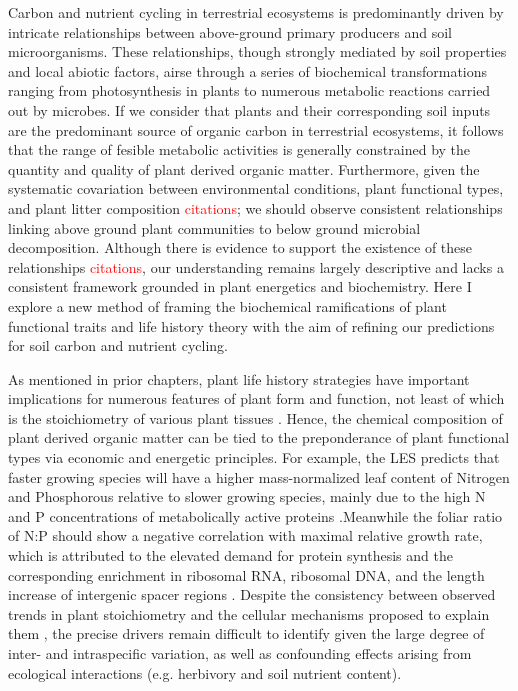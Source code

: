 Carbon and nutrient cycling in terrestrial ecosystems is predominantly driven by intricate relationships between above-ground primary producers and soil microorganisms. These relationships, though strongly mediated by soil properties and local abiotic factors, airse through a series of biochemical transformations ranging from photosynthesis in plants to numerous metabolic reactions carried out by microbes. If we consider that plants and their corresponding soil inputs are the predominant source of organic carbon in terrestrial ecosystems, it follows that the range of fesible metabolic activities is generally constrained by the quantity and quality of plant derived organic matter. Furthermore, given the systematic covariation between environmental conditions, plant functional types, and plant litter composition \textcolor{red}{citations}; we should observe consistent relationships linking above ground plant communities to below ground microbial decomposition. Although there is evidence to support the existence of these relationships \textcolor{red}{citations}, our understanding remains largely descriptive and lacks a consistent framework grounded in plant energetics and biochemistry. Here I explore a new method of framing the biochemical ramifications of plant functional traits and life history theory with the aim of refining our predictions for soil carbon and nutrient cycling. 


As mentioned in prior chapters, plant life history strategies have important implications for numerous features of plant form and function, not least of which is the stoichiometry of various plant tissues \cite{reich2014a,wright2004a}. Hence, the chemical composition of plant derived organic matter can be tied to the preponderance of plant functional types via economic and energetic principles. For example, the LES predicts that faster growing species will have a higher mass-normalized leaf content of Nitrogen and Phosphorous relative to slower growing species, mainly due to the high N and P concentrations of metabolically active proteins \cite{diaz_global_2016}.Meanwhile the foliar ratio of N:P should show a negative correlation with maximal relative growth rate, which is attributed to the elevated demand for protein synthesis and the corresponding enrichment in ribosomal RNA, ribosomal DNA, and the length increase of intergenic spacer regions \cite{gusewell_n_2004, elser_biological_2000}. Despite the consistency between observed trends in plant stoichiometry and the cellular mechanisms proposed to explain them , the precise drivers remain difficult to identify given the large degree of inter- and intraspecific variation, as well as confounding effects arising from ecological interactions (e.g. herbivory and soil nutrient content).

